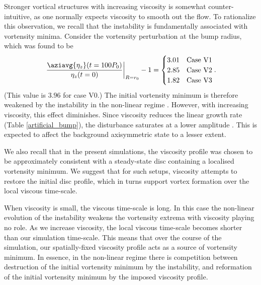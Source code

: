 Stronger vortical structures with increasing viscosity is somewhat counter-intuitive, 
as one normally expects viscosity to smooth out the flow. To
rationalize this observation, we recall that the instability is
fundamentally associated with vortensity minima. Consider the
vortensity perturbation at the bump radius, which was found to be 
\begin{align}
  \left.\frac{\aziavg{\eta_z}(t=100P_0)}{\eta_z(t=0)}\right|_{R=r_0} - 1 = 
  \begin{cases}
   3.01  & \text{Case V1} \\
   2.85  & \text{Case V2} \\
   1.82  & \text{Case V3} \\
  \end{cases}.
\end{align} 
(This value is $3.96$ for case V0.) The initial vortensity minimum is
therefore weakened by the instability in the non-linear regime
\citep{meheut10}. However, with increasing viscosity, this effect
diminishes. Since viscosity reduces the linear growth rate (Table
\ref{artificial_bump}), the disturbance saturates at a lower amplitude
\citep{meheut13}. This is expected to affect the background
axisymmetric state to a lesser extent.  

We also recall that in the present simulations, 
the viscosity profile was chosen to be
approximately consistent with a steady-state disc containing a
localised vortensity minimum.  We suggest that for
such setups, viscosity attempts to restore the initial disc profile,
which in turns support vortex formation over the local viscous
time-scale.  


When viscosity is small, the viscous time-scale is long. In this case
the non-linear evolution of the instability weakens the vortensity
extrema with viscosity playing no role. 
As we increase viscosity, the local viscous time-scale
becomes shorter than our simulation time-scale. This means that over
the course of the simulation, our spatially-fixed viscosity profile acts
as a source of vortensity minimum. In essence, in the non-linear
regime there is competition
between destruction of the initial vortensity minimum by the 
instability, and reformation of the initial vortensity minimum by the
imposed viscosity profile. 

